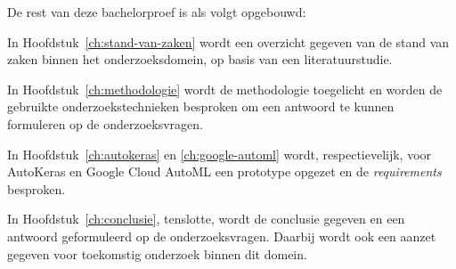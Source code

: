 
De rest van deze bachelorproef is als volgt opgebouwd:

In Hoofdstuk~\ref{ch:stand-van-zaken} wordt een overzicht gegeven van de stand van zaken binnen het onderzoeksdomein, op basis van een literatuurstudie.

In Hoofdstuk~\ref{ch:methodologie} wordt de methodologie toegelicht en worden de gebruikte onderzoekstechnieken besproken om een antwoord te kunnen formuleren op de onderzoeksvragen.

In Hoofdstuk~\ref{ch:autokeras} en \ref{ch:google-automl} wordt, respectievelijk, voor AutoKeras en Google Cloud AutoML een prototype opgezet en de \textit{requirements} besproken.

In Hoofdstuk~\ref{ch:conclusie}, tenslotte, wordt de conclusie gegeven en een antwoord geformuleerd op de onderzoeksvragen. Daarbij wordt ook een aanzet gegeven voor toekomstig onderzoek binnen dit domein.
